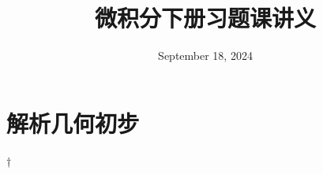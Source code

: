 \documentclass[lang=cn,10pt]{elegantbook}
\title{微积分\Rmnum{1}下册习题课讲义}
\date{September 18, 2024}
\begin{document}
\maketitle
\frontmatter

\tableofcontents

\mainmatter
\chapter{解析几何初步}


†\appendix
\end{document}
